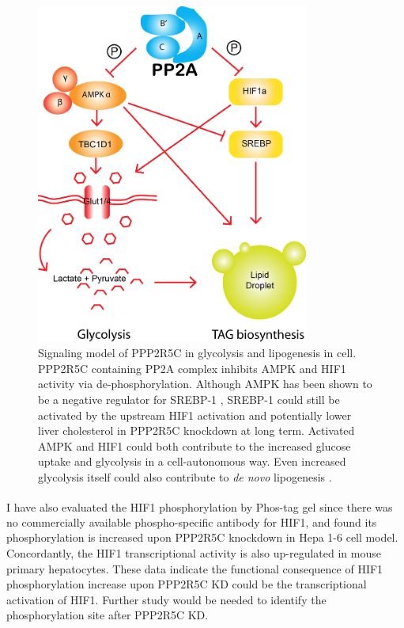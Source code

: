 \begin{figure}[!tb]
\centering
\includegraphics[width=0.8\textwidth]{figs/fig2-59 signaling model.png}
\caption[Cell-autonomous model for PPP2R5C in metabolic control]{\footnotesize Signaling model of PPP2R5C in glycolysis and lipogenesis in cell. PPP2R5C containing PP2A complex inhibits AMPK and HIF1\textalpha{} activity via de-phosphorylation. Although AMPK has been shown to be a negative regulator for SREBP-1 \cite{li_ampk_2011}, SREBP-1 could still be activated by the upstream HIF1\textalpha{} activation \cite{li_intermittent_2005} and potentially lower liver cholesterol in PPP2R5C knockdown at long term. Activated AMPK \cite{zhou_akt_2008,wu_ampk-dependent_2013,vichaiwong_contraction_2010} and HIF1\textalpha{} \cite{ochiai_disruption_2011,denko_hypoxia_2008} could both contribute to the increased glucose uptake and glycolysis in a cell-autonomous way. Even increased glycolysis itself could also contribute to \textit{de novo} lipogenesis \cite{hagiwara_hepatic_2012,foufelle_new_2002}. }
\label{fig:fig2.59}
\end{figure}

I have also evaluated the HIF1\textalpha{} phosphorylation  by Phos-tag\textsuperscript{\textregistered} gel since there was no commercially available phospho-specific antibody for HIF1\textalpha{}, and found its phosphorylation is increased upon PPP2R5C knockdown in Hepa 1-6 cell model. Concordantly, the HIF1\textalpha{} transcriptional activity is also up-regulated in mouse primary hepatocytes. These data indicate the functional consequence of HIF1\textalpha{} phosphorylation increase upon PPP2R5C KD could be the transcriptional activation of HIF1\textalpha{}. Further study would be needed to identify the phosphorylation site after PPP2R5C KD.  


